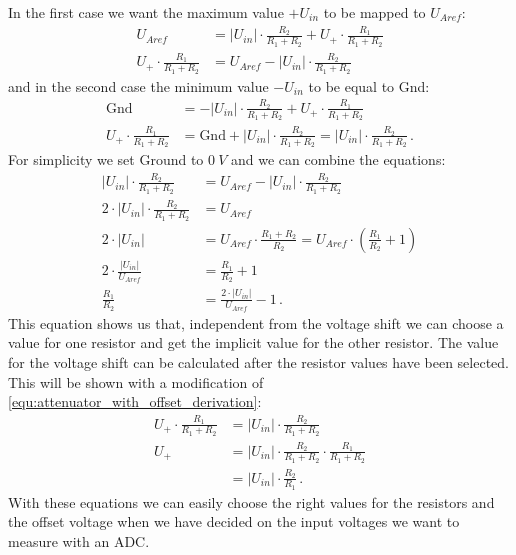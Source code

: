 In the first case we want the maximum value $+U_{in}$ to be mapped to $U_{Aref}$:
\begin{align}
	U_{Aref} &= \lvert U_{in} \rvert \cdot \frac{R_2}{R_1 + R_2} + U_+ \cdot \frac{R_1}{R_1 + R_2} \\
	U_+ \cdot \frac{R_1}{R_1 + R_2} &= U_{Aref} - \lvert U_{in} \rvert \cdot \frac{R_2}{R_1 + R_2}
\end{align}
and in the second case the minimum value $-U_{in}$ to be equal to Gnd:
\begin{align}
	\text{Gnd} &= - \lvert U_{in} \rvert \cdot \frac{R_2}{R_1 + R_2} + U_+ \cdot \frac{R_1}{R_1 + R_2} \\
	U_+ \cdot \frac{R_1}{R_1 + R_2} &= \text{Gnd} + \lvert U_{in} \rvert \cdot \frac{R_2}{R_1 + R_2} = \lvert U_{in} \rvert \cdot \frac{R_2}{R_1 + R_2}\,.
	\label{equ:attenuator_with_offset_derivation}
\end{align}
For simplicity we set Ground to $\SI{0}{V}$ and we can combine the equations:
\begin{align}
	\lvert U_{in} \rvert \cdot \frac{R_2}{R_1 + R_2} &= U_{Aref} - \lvert U_{in} \rvert \cdot \frac{R_2}{R_1 + R_2} \\
	2 \cdot \lvert U_{in} \rvert \cdot \frac{R_2}{R_1 + R_2} &= U_{Aref} \\
	2 \cdot \lvert U_{in} \rvert &= U_{Aref} \cdot \frac{R_1 + R_2}{R_2} = U_{Aref} \cdot \left( \frac{R_1}{R_2} + 1 \right) \\
	2 \cdot \frac{\lvert U_{in} \rvert}{U_{Aref}} &= \frac{R_1}{R_2} + 1 \\
	\frac{R_1}{R_2} &= \frac{2 \cdot \lvert U_{in} \rvert}{U_{Aref}} - 1\,.
\end{align}
This equation shows us that, independent from the voltage shift we can choose a value for one resistor and get the implicit value for the other resistor. The value for the voltage shift can be calculated after the resistor values have been selected. This will be shown with a modification of \cref{equ:attenuator_with_offset_derivation}:
\begin{align}
	U_+ \cdot \frac{R_1}{R_1 + R_2} &= \lvert U_{in} \rvert \cdot \frac{R_2}{R_1 + R_2} \\
	U_+ &= \lvert U_{in} \rvert \cdot \frac{R_2}{R_1 + R_2} \cdot \frac{R_1}{R_1 + R_2} \\
			&= \lvert U_{in} \rvert \cdot \frac{R_2}{R_1}\,.
\end{align}
With these equations we can easily choose the right values for the resistors and the offset voltage when we have decided on the input voltages we want to measure with an ADC.


